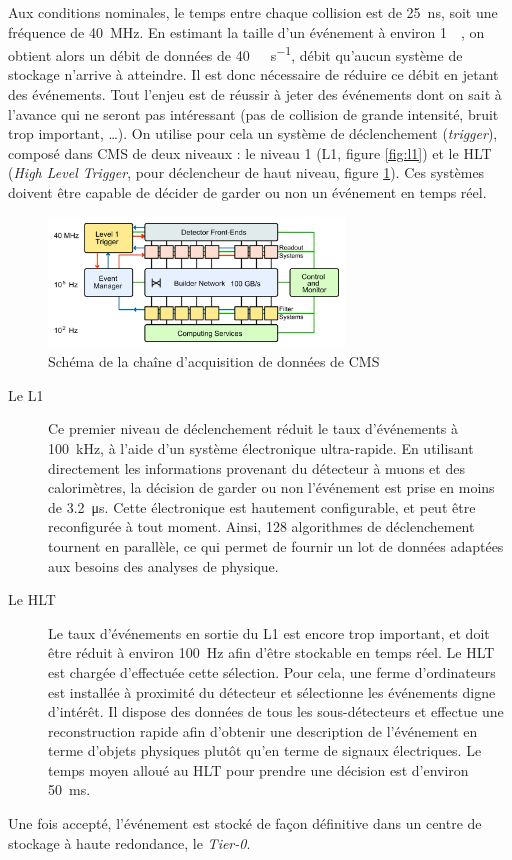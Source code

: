 Aux conditions nominales, le temps entre chaque collision est de \SI{25}{\ns}, soit une fréquence de \SI{40}{\mega\hertz}. En estimant la taille d'un événement à environ \SI{1}{\mega\octet}, on obtient alors un débit de données de \SI{40}{\tera\octet\per\second}, débit qu'aucun système de stockage n'arrive à atteindre. Il est donc nécessaire de réduire ce débit en jetant des événements. Tout l'enjeu est de réussir à jeter des événements dont on sait à l'avance qui ne seront pas intéressant (pas de collision de grande intensité, bruit trop important, \ldots). On utilise pour cela un système de déclenchement (\emph{trigger}), composé dans CMS de deux niveaux : le niveau 1 (L1, figure \ref{fig:l1}) et le HLT (\emph{High Level Trigger}, pour déclencheur de haut niveau, figure \ref{fig:daq}). Ces systèmes doivent être capable de décider de garder ou non un événement en temps réel.

\begin{figure}[b] \centering
  \includegraphics[width=0.7\textwidth]{chapitre2/figs/DAQ.pdf}
  \caption{Schéma de la chaîne d'acquisition de données de CMS}
  \label{fig:daq}
\end{figure}

\begin{description}
  \item[Le L1] Ce premier niveau de déclenchement réduit le taux d’événements à \SI{100}{\kHz}, à l'aide d'un système électronique ultra-rapide. En utilisant directement les informations provenant du détecteur à muons et des calorimètres, la décision de garder ou non l'événement est prise en moins de \SI{3.2}{\us}. Cette électronique est hautement configurable, et peut être reconfigurée à tout moment. Ainsi, 128 algorithmes de déclenchement tournent en parallèle, ce qui permet de fournir un lot de données adaptées aux besoins des analyses de physique.
  \item[Le HLT] Le taux d'événements en sortie du L1 est encore trop important, et doit être réduit à environ \SI{100}{\Hz} afin d'être stockable en temps réel. Le HLT est chargée d'effectuée cette sélection. Pour cela, une ferme d'ordinateurs est installée à proximité du détecteur et sélectionne les événements digne d’intérêt. Il dispose des données de tous les sous-détecteurs et effectue une reconstruction rapide afin d'obtenir une description de l'événement en terme d'objets physiques plutôt qu'en terme de signaux électriques. Le temps moyen alloué au HLT pour prendre une décision est d'environ \SI{50}{\ms}.
\end{description}

Une fois accepté, l'événement est stocké de façon définitive dans un centre de stockage à haute redondance, le \emph{Tier-0}.